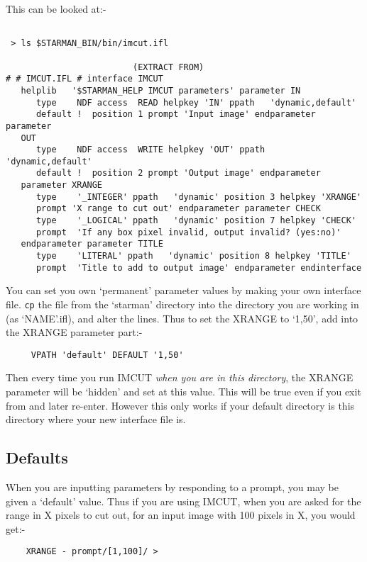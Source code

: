 This can be looked at:- \begin{verbatim}

 > ls $STARMAN_BIN/bin/imcut.ifl

                         (EXTRACT FROM)
# # IMCUT.IFL # interface IMCUT
   helplib   '$STARMAN_HELP IMCUT parameters' parameter IN
      type    NDF access  READ helpkey 'IN' ppath   'dynamic,default'
      default !  position 1 prompt 'Input image' endparameter parameter
   OUT
      type    NDF access  WRITE helpkey 'OUT' ppath   'dynamic,default'
      default !  position 2 prompt 'Output image' endparameter
   parameter XRANGE
      type    '_INTEGER' ppath   'dynamic' position 3 helpkey 'XRANGE'
      prompt 'X range to cut out' endparameter parameter CHECK
      type    '_LOGICAL' ppath   'dynamic' position 7 helpkey 'CHECK'
      prompt  'If any box pixel invalid, output invalid? (yes:no)'
   endparameter parameter TITLE
      type    'LITERAL' ppath   'dynamic' position 8 helpkey 'TITLE'
      prompt  'Title to add to output image' endparameter endinterface
\end{verbatim}

You can set you own `permanent' parameter values by making your own
interface file. \verb|cp| the file from the `starman' directory into
the directory you are working in (as `NAME'.ifl), and alter the lines.
Thus to set the XRANGE to `1,50', add into the XRANGE parameter part:-

\begin{verbatim}
     VPATH 'default' DEFAULT '1,50' \end{verbatim}

Then every time you run IMCUT {\em when you are in this directory}, the
XRANGE parameter will be `hidden' and set at this value. This will be
true even if you exit from \starman and later re-enter. However this
only works if your default directory is this directory where your new
interface file is.

\subsection{Defaults} \label{se:param_def}

When you are inputting parameters by responding to a prompt, you may be
given a `default' value. Thus if you are using IMCUT, when you are
asked for the range in X pixels to cut out, for an input image with 100
pixels in X, you would get:- \begin{verbatim}
    XRANGE - prompt/[1,100]/ > \end{verbatim}

